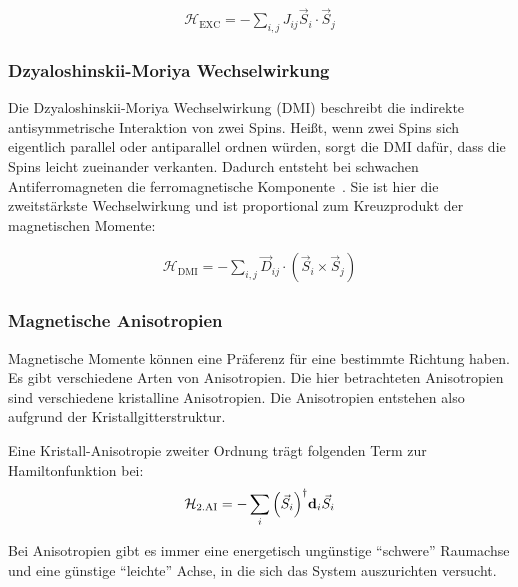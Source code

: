 \documentclass[main.tex]{subfiles}
\begin{document}
\begin{align}
	\mathcal{H}_{\text{EXC}} = -\sum_{i,j} J_{ij} \vec{S}_i \cdot
	\vec{S}_j\label{eq:hamilton-heisenberg-exc}
\end{align}

\subsubsection*{Dzyaloshinskii-Moriya Wechselwirkung}

Die Dzyaloshinskii-Moriya Wechselwirkung (DMI) beschreibt die indirekte antisymmetrische Interaktion von zwei Spins. Heißt, wenn zwei Spins sich eigentlich parallel oder antiparallel ordnen würden, sorgt die DMI dafür, dass die Spins leicht zueinander verkanten. Dadurch entsteht bei schwachen Antiferromagneten die ferromagnetische Komponente~\cite{DMI}.
Sie ist hier die zweitstärkste Wechselwirkung und ist proportional zum Kreuzprodukt der magnetischen Momente:

\begin{align}
	\mathcal{H}_{\text{DMI}} = -\sum_{i,j} \vec{D}_{ij} \cdot (\vec{S}_i
	\times
	\vec{S}_j)\label{eq:hamilton-dmi}
\end{align}


\subsubsection*{Magnetische Anisotropien}
Magnetische Momente können eine Präferenz für eine bestimmte Richtung haben.
Es gibt verschiedene Arten von Anisotropien.
Die hier betrachteten Anisotropien sind verschiedene kristalline Anisotropien.
Die Anisotropien entstehen also aufgrund der Kristallgitterstruktur. 

Eine Kristall-Anisotropie zweiter Ordnung trägt folgenden Term zur Hamiltonfunktion bei:
\begin{align}
	\mathcal{H}_{\text{2.AI}} = -\sum_{i} \qty(\vec{S}_i)^\dagger
	\bm{\mathrm{d}}_i
	\vec{S}_i\label{eq:hamilton-2a}
\end{align}

Bei Anisotropien gibt es immer eine energetisch ungünstige \enquote{schwere} Raumachse und eine günstige \enquote{leichte} Achse, in die sich das System auszurichten versucht.
\end{document}
